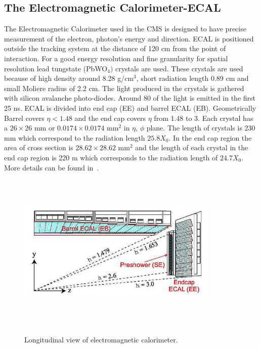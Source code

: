 \smallskip
\subsection{The Electromagnetic Calorimeter-ECAL}
The Electromagnetic Calorimeter used in the CMS is designed to
have precise measurement of the electron, photon's energy and
direction. ECAL is positioned outside the tracking system at
the distance of 120 cm from the point of interaction. For a
good energy resolution and fine granularity for spatial
resolution lead tungstate (PbWO$_{4})$ crystals are used. These
crystals are used because of high density around 8.28
g/cm$^{3}$, short radiation length 0.89 cm and small Moliere
radius of 2.2 cm. The light produced in the crystals is
gathered with silicon avalanche photo-diodes. Around 80 of the
light is emitted in the first 25 ns. ECAL is divided into end
cap (EE) and barrel ECAL (EB). Geometrically Barrel covers
$\eta<1.48$ and the end cap covers $\eta$ from 1.48 to 3. Each
crystal has a $26\times26$ mm or $0.0174\times 0.0174 $
mm$^{2}$ in $\eta$, $\phi$ plane. The length of crystals is 230
mm which correspond to the radiation length $25.8 X_{0}$. In
the end cap region the area of cross section is $28.62\times
28.62$ mm$^{2}$ and the length of each crystal in the end cap
region is 220 m which corresponds to the radiation length of
$24.7 X_{0}$. More details can be found in~\cite{cms-tdr1}.
    \begin{figure}[h]
    \begin{center}
    \includegraphics[width=3.8in, height= 3.0in]{pic/ecal} \\
    \caption{Longitudinal view of electromagnetic calorimeter. }
    \end{center}
    \end{figure}

